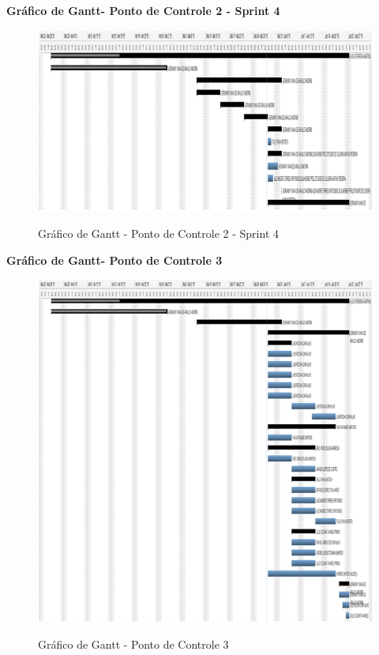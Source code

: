    \pagebreak
  \textbf{Gráfico de Gantt- Ponto de Controle 2 - Sprint 4}
   \begin{figure}[!h]
    \centering
    \includegraphics[scale = 1]{editaveis/figuras/ganttPC2S4}
    \label{Gráfico de Gantt PC2S4}
    \caption{Gráfico de Gantt - Ponto de Controle 2 - Sprint 4}
   \end{figure}
   \FloatBarrier
   
  \pagebreak
  \textbf{Gráfico de Gantt- Ponto de Controle 3}
   \begin{figure}[!h]
    \centering
    \includegraphics[scale = 1]{editaveis/figuras/ganttPC3}
    \label{Gráfico de Gantt PC3}
    \caption{Gráfico de Gantt - Ponto de Controle 3}
   \end{figure}
   \FloatBarrier